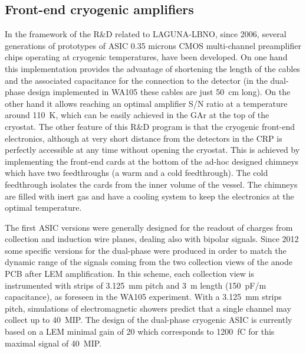\subsection{Front-end cryogenic amplifiers}
In the framework of the R\&D related to LAGUNA-LBNO, since 2006,
several generations of prototypes of ASIC 0.35 microns CMOS
multi-channel preamplifier chips operating at cryogenic temperatures,
have been developed. On one hand this implementation provides the
advantage of shortening the length of the cables and the associated
capacitance for the connection to the detector (in the dual-phase
design implemented in WA105 these cables are just 50~cm long). On the
other hand it allows reaching an optimal amplifier S/N ratio at a
temperature around 110~K, which can be easily achieved in the GAr at
the top of the cryostat. The other feature of this R\&D program is
that the cryogenic front-end electronics, although at very short
distance from the detectors in the CRP is perfectly accessible at any
time without opening the cryostat. This is achieved by implementing
the front-end cards at the bottom of the ad-hoc designed chimneys
which have two feedthroughs (a warm and a cold feedthrough). The cold
feedthrough isolates the cards from the inner volume of the
vessel. The chimneys are filled with inert gas and have a cooling
system to keep the electronics at the optimal temperature.

The first ASIC versions were generally designed for the readout of
charges from collection and induction wire planes, dealing also with
bipolar signals. Since 2012 some specific versions for the
dual-phase were produced in order to match the dynamic range of the
signals coming from the two collection views of the anode PCB after
LEM amplification. In this scheme, each collection view is
instrumented with strips of 3.125~mm pitch and 3~m length (150~pF/m
capacitance), as foreseen in the WA105 experiment. With a 3.125~mm
strips pitch, simulations of electromagnetic showers predict that a
single channel may collect up to 40~MIP. The design of the
dual-phase cryogenic ASIC is currently based on a LEM minimal gain
of 20 which corresponds to 1200~fC for this maximal signal of 40~MIP.

